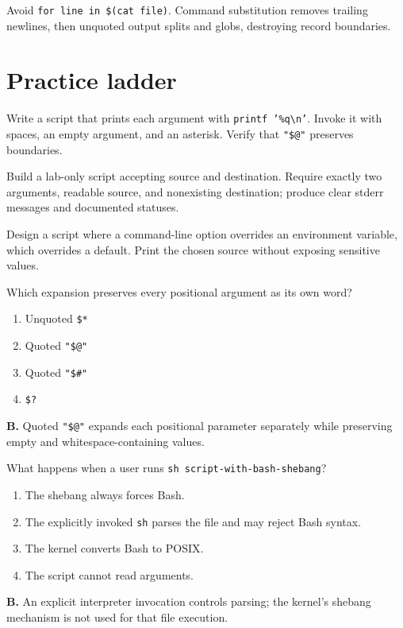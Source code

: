 \documentclass[11pt,oneside,openany]{book}
\newcommand{\fourchoices}[4]{%
  \begin{enumerate}[label=\Alph*),leftmargin=2em,itemsep=0.25em]
    \item #1
    \item #2
    \item #3
    \item #4
  \end{enumerate}}
\begin{document}
Avoid \texttt{for line in \$(cat file)}. Command substitution removes trailing newlines, then unquoted output splits and globs, destroying record boundaries.

\section{Practice ladder}
\begin{practicebox}[title={Easy -- argument boundaries}]
Write a script that prints each argument with \texttt{printf '\%q\textbackslash n'}. Invoke it with spaces, an empty argument, and an asterisk. Verify that \texttt{"\$@"} preserves boundaries.
\end{practicebox}
\begin{practicebox}[title={Medium -- validated copier}]
Build a lab-only script accepting source and destination. Require exactly two arguments, readable source, and nonexisting destination; produce clear stderr messages and documented statuses.
\end{practicebox}
\begin{practicebox}[title={Hard -- configuration precedence}]
Design a script where a command-line option overrides an environment variable, which overrides a default. Print the chosen source without exposing sensitive values.
\end{practicebox}

\begin{questionbox}[title={Medium 17.1 -- Arguments}]
Which expansion preserves every positional argument as its own word?
\fourchoices{Unquoted \texttt{\$*}}{Quoted \texttt{"\$@"}}{Quoted \texttt{"\$\#"}}{\texttt{\$?}}
\end{questionbox}
\begin{answerbox}
\textbf{B.} Quoted \texttt{"\$@"} expands each positional parameter separately while preserving empty and whitespace-containing values.
\end{answerbox}

\begin{questionbox}[title={Hard 17.2 -- Interpreter}]
What happens when a user runs \texttt{sh script-with-bash-shebang}?
\fourchoices{The shebang always forces Bash.}{The explicitly invoked \texttt{sh} parses the file and may reject Bash syntax.}{The kernel converts Bash to POSIX.}{The script cannot read arguments.}
\end{questionbox}
\begin{answerbox}
\textbf{B.} An explicit interpreter invocation controls parsing; the kernel's shebang mechanism is not used for that file execution.
\end{answerbox}
\end{document}
